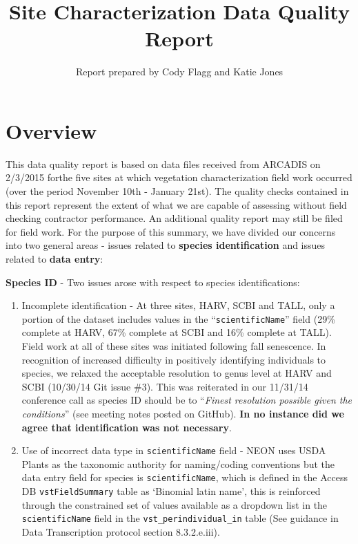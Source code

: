 \documentclass[]{article}
\title{Site Characterization Data Quality Report}
\author{Report prepared by Cody Flagg and Katie Jones}
\date{}
\begin{document}
\maketitle


{
\hypersetup{linkcolor=black}
\setcounter{tocdepth}{2}
\tableofcontents
}
\section{Overview}\label{overview}

This data quality report is based on data files received from ARCADIS on
2/3/2015 forthe five sites at which vegetation characterization field
work occurred (over the period November 10th - January 21st). The
quality checks contained in this report represent the extent of what we
are capable of assessing without field checking contractor performance.
An additional quality report may still be filed for field work. For the
purpose of this summary, we have divided our concerns into two general
areas - issues related to \textbf{species identification} and issues
related to \textbf{data entry}:

\textbf{Species ID} - Two issues arose with respect to species
identifications:

\begin{enumerate}
\def\labelenumi{\arabic{enumi}.}
\item
  Incomplete identification - At three sites, HARV, SCBI and TALL, only
  a portion of the dataset includes values in the
  ``\texttt{scientificName}'' field (29\% complete at HARV, 67\%
  complete at SCBI and 16\% complete at TALL). Field work at all of
  these sites was initiated following fall senescence. In recognition of
  increased difficulty in positively identifying individuals to species,
  we relaxed the acceptable resolution to genus level at HARV and SCBI
  (10/30/14 Git issue \#3). This was reiterated in our 11/31/14
  conference call as species ID should be to ``\emph{Finest resolution
  possible given the conditions}'' (see meeting notes posted on GitHub).
  \textbf{In no instance did we agree that identification was not
  necessary}.
\item
  Use of incorrect data type in \texttt{scientificName} field - NEON
  uses USDA Plants as the taxonomic authority for naming/coding
  conventions but the data entry field for species is
  \texttt{scientificName}, which is defined in the Access DB
  \texttt{vstFieldSummary} table as `Binomial latin name', this is
  reinforced through the constrained set of values available as a
  dropdown list in the \texttt{scientificName} field in the
  \texttt{vst\_perindividual\_in} table (See guidance in Data
  Transcription protocol section 8.3.2.e.iii).
\end{enumerate}
\end{document}
